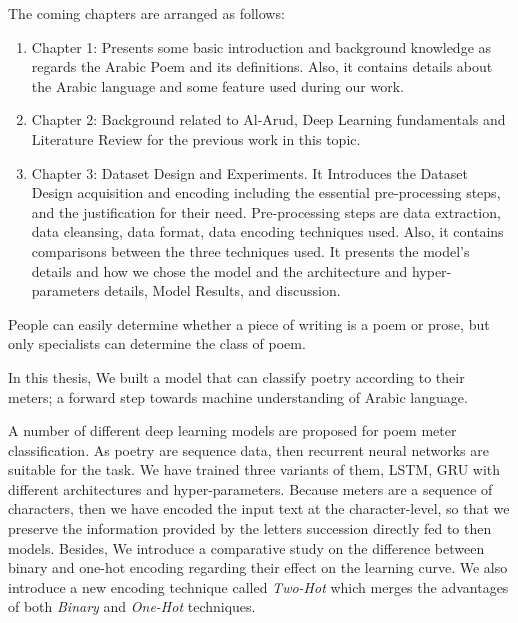 \begin{spacing}{1}\end{spacing}
The coming chapters are arranged as follows:
\begin{enumerate}
\item Chapter 1: Presents some basic introduction and background knowledge as regards the Arabic Poem and its definitions. Also, it contains details about the Arabic language and some feature used during our work.
  \item Chapter 2: Background related to Al-Arud, Deep Learning fundamentals and Literature Review for the previous work in this topic.
  \item Chapter 3: Dataset Design and Experiments. It Introduces the Dataset Design acquisition and encoding including the essential pre-processing steps, and the justification for their need. Pre-processing steps are data extraction, data cleansing, data format, data encoding techniques used. Also, it contains comparisons between the three techniques used. It presents the model’s details and how we chose the model and the architecture and hyper-parameters details, Model Results, and discussion.
\end{enumerate}


\begin{spacing}{1}\end{spacing}


People can easily determine whether a piece of writing is a poem or prose, but only specialists can determine the class of poem.

In this thesis, We built a model that can classify poetry according to their meters; a forward step towards machine understanding of Arabic language.

A number of different deep learning models are proposed for poem meter classification. As poetry are sequence data, then recurrent neural networks are suitable for the task. We have trained three variants of them, LSTM, GRU with different architectures and hyper-parameters. Because meters are a sequence of characters, then we have encoded the input text at the character-level, so that we preserve the information provided by the letters succession directly fed to then models. Besides, We introduce a comparative study on the difference between binary and one-hot encoding regarding their effect on the learning curve. We also introduce a new encoding technique called \textit{Two-Hot} which merges the advantages of both \textit{Binary} and \textit{One-Hot} techniques.


